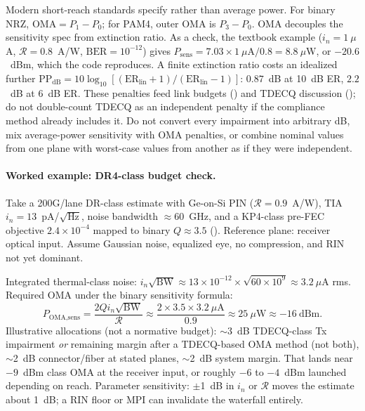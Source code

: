 Modern short-reach standards specify  rather than average power. For
binary NRZ, $\mathrm{OMA}=P_1-P_0$; for PAM4, outer OMA is $P_3-P_0$. OMA
decouples the sensitivity spec from extinction ratio. As a check, the textbook
example ($i_n = 1~\mu$A, $\mathcal{R}=0.8$~A/W, $\mathrm{BER}=10^{-12}$) gives
$P_{\text{sens}}=7.03\times1~\mu\text{A}/0.8 = 8.8~\mu$W, or $-20.6$~dBm, which
the code reproduces. A finite extinction ratio costs an idealized further
$\mathrm{PP}_\mathrm{dB}=10\log_{10}[(\mathrm{ER}_\mathrm{lin}+1)/(\mathrm{ER}_\mathrm{lin}-1)]$:
$0.87$~dB at 10~dB ER, $2.2$~dB at 6~dB ER. These penalties feed link budgets
() and TDECQ discussion (); do not double-count
TDECQ as an independent penalty if the compliance method already includes it. Do
not convert every impairment into arbitrary dB, mix average-power sensitivity
with OMA penalties, or combine nominal values from one plane with worst-case
values from another as if they were independent.

\paragraph{Worked example: DR4-class budget check.}
\label{sec:worked-budget}

Take a 200G/lane DR-class estimate with Ge-on-Si PIN ($\mathcal{R}=0.9$~A/W), TIA
$i_n=13$~pA/$\sqrt{\text{Hz}}$, noise bandwidth $\approx60$~GHz, and a KP4-class
pre-FEC objective $2.4\times10^{-4}$ mapped to binary $Q\approx3.5$
(). Reference plane: receiver optical input. Assume
Gaussian noise, equalized eye, no compression, and RIN not yet dominant.

Integrated thermal-class noise: $i_n \sqrt{\mathrm{BW}} \approx
13\times10^{-12}\times\sqrt{60\times10^9} \approx 3.2~\mu$A rms. Required OMA
under the binary sensitivity formula:
\[
P_{\text{OMA,sens}} = \frac{2 Q i_n \sqrt{\mathrm{BW}}}{\mathcal{R}}
\approx \frac{2\times3.5\times3.2~\mu\text{A}}{0.9} \approx 25~\mu\text{W}
\approx -16~\text{dBm}.
\]
Illustrative allocations (not a normative budget): $\sim$3~dB TDECQ-class Tx
impairment \emph{or} remaining margin after a TDECQ-based OMA method (not both),
$\sim$2~dB connector/fiber at stated planes, $\sim$2~dB system margin. That lands
near $-9$~dBm class OMA at the receiver input, or roughly $-6$ to $-4$~dBm
launched depending on reach. Parameter sensitivity: $\pm$1~dB in $i_n$ or
$\mathcal{R}$ moves the estimate about 1~dB; a RIN floor or MPI can invalidate
the waterfall entirely.


